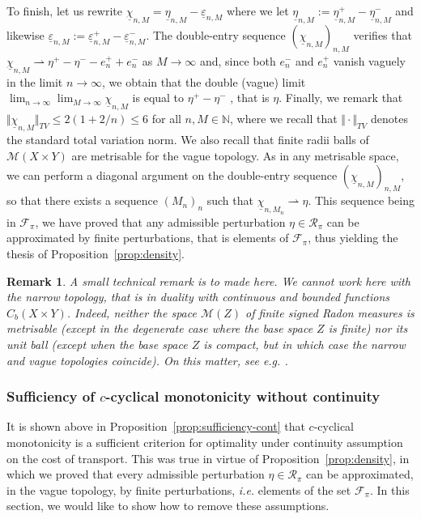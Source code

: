 \documentclass[leqno, 11pt, a4paper]{amsart}
\newtheorem{rem}{Remark}
\theoremstyle{definition}
\newcommand{\cR}{\mathcal{R}}
\newcommand{\N}{\mathbb{N}}
\newcommand{\cF}{\mathcal{F}}
\newcommand{\eps}{\varepsilon}
\newcommand{\cM}{\mathcal{M}}
\newcommand{\wto}{\rightharpoonup}
\begin{document}
To finish, let us rewrite $\underline{\chi}_{n, M} = \underline{\eta}_{n, M} - \underline{\eps}_{n, M}$ where we let $\underline{\eta}_{n, M} := \underline{\eta}^+_{n, M} - \underline{\eta}^-_{n, M}$ and likewise $\underline{\eps}_{n, M} := \underline{\eps}^+_{n, M} - \underline{\eps}^-_{n, M}$. The double-entry sequence $(\underline{\chi}_{n, M})_{n, M}$ verifies that $\underline{\chi}_{n, M} \wto \eta^+ - \eta^- -e^+_n + e^-_n$ as $M \to \infty$ and, since both $e^-_n$ and $e^+_n$ vanish vaguely in the limit $n \to \infty$, we obtain that the double (vague) limit $\lim_{n \to \infty} \lim_{M \to \infty} \underline{\chi}_{n, M}$ is equal to $\eta^+ - \eta^-$ , that is $\eta$. Finally, we remark that $\Vert \underline{\chi}_{n, M} \Vert_{TV} \leq 2(1+2/n) \leq 6$ for all $n, M \in \N$, where we recall that $\Vert \cdot \Vert_{TV}$ denotes the standard total variation norm.  We also recall that finite radii balls of $\cM(X \times Y)$ are metrisable for the vague topology. As in any metrisable space, we can perform a diagonal argument on the double-entry sequence $(\underline{\chi}_{n, M})_{n, M}$, so that there exists a sequence $(M_n)_n$ such that $\underline{\chi}_{n, M_n} \wto \eta$. This sequence being in $\cF_\pi$, we have proved that any admissible perturbation $\eta \in \cR_\pi$ can be approximated by finite perturbations, that is elements of $\cF_\pi$, thus yielding the thesis of Proposition~\ref{prop:density}.
\begin{rem}
	A small technical remark is to made here. We cannot work here with the \textit{narrow topology}, that is in duality with continuous and bounded functions $C_b(X \times Y)$. Indeed, neither the space $\cM(Z)$ of finite signed Radon measures is metrisable (except in the degenerate case where the base space $Z$ is finite) nor its unit ball (except when the base space $Z$ is compact, but in which case the narrow and vague topologies coincide). On this matter, see \textit{e.g.} \cite{varadarajanWeakConvergenceMeasures1958}.
\end{rem}


\subsubsection{Sufficiency of $c$-cyclical monotonicity without continuity}
It is shown above in Proposition~\ref{prop:sufficiency-cont} that $c$-cyclical monotonicity is a sufficient criterion for optimality under continuity assumption on the cost of transport. This was true in virtue of Proposition~\ref{prop:density}, in which we proved that every admissible perturbation $\eta \in \cR_\pi$ can be approximated, in the vague topology, by finite perturbations, \textit{i.e.} elements of the set $\cF_\pi$.  In this section, we would like to show how to remove these assumptions.
\end{document}
